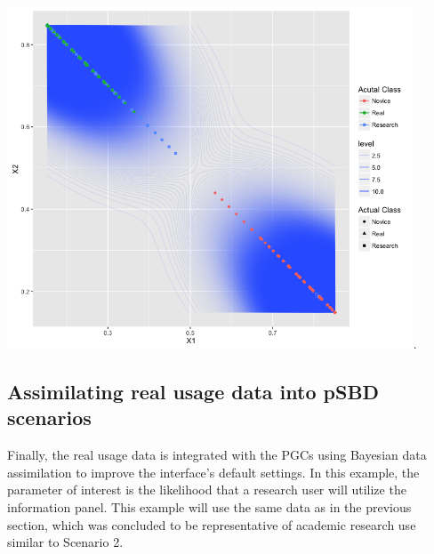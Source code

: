 \documentclass[]{article}
\begin{document}
\includegraphics[height=4.00000in]{./clusters.png}.

\subsection{Assimilating real usage data into pSBD
scenarios}\label{assimilating-real-usage-data-into-psbd-scenarios}

Finally, the real usage data is integrated with the PGCs using Bayesian
data assimilation to improve the interface's default settings. In this
example, the parameter of interest is the likelihood that a research
user will utilize the information panel. This example will use the same
data as in the previous section, which was concluded to be
representative of academic research use similar to Scenario 2.
\end{document}
